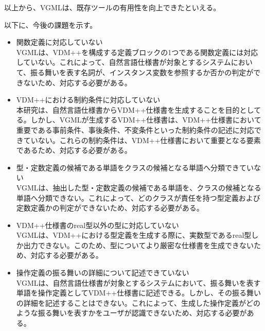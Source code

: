 以上から、VGMLは、既存ツールの有用性を向上できたといえる。

以下に、今後の課題を示す。

\begin{itemize}
	\item 関数定義に対応していない\\VGMLは、VDM++を構成する定義ブロックの1つである関数定義には対応していない。これによって、自然言語仕様書が対象とするシステムにおいて、振る舞いを表す名詞が、インスタンス変数を参照するか否かの判定ができないため、対応する必要がある。
	\item VDM++における制約条件に対応していない\\本研究は、自然言語仕様書からVDM++仕様書を生成することを目的としてる。しかし、VGMLが生成するVDM++仕様書は、VDM++仕様書において重要である事前条件、事後条件、不変条件といった制約条件の記述に対応できていない。これらの制約条件は、VDM++仕様書において重要となる要素であるため、対応する必要がある。
	\item 型・定数定義の候補である単語をクラスの候補となる単語へ分類できていない\\VGMLは、抽出した型・定数定義の候補である単語を、クラスの候補となる単語へ分類できない。これによって、どのクラスが責任を持つ型定義および定数定義かの判定ができないため、対応する必要がある。
	\item VDM++仕様書のreal型以外の型に対応していない\\VGMLは、VDM++における型定義を生成する際に、実数型であるreal型しか出力できない。このため、型についてより厳密な仕様書を生成できないため、対応する必要がある。
	\item 操作定義の振る舞いの詳細について記述できていない\\VGMLは、自然言語仕様書が対象とするシステムにおいて、振る舞いを表す単語を操作定義としてVDM++仕様書に記述できる。しかし、その振る舞いの詳細を記述することはできない。これによって、生成した操作定義がどのような振る舞いを表すかをユーザが認識できないため、対応する必要がある。
\end{itemize}

